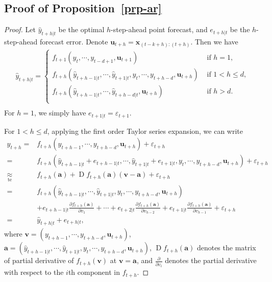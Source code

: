 \documentclass[
  11pt,
  a4paper,
]{article}
\theoremstyle{plain}
\theoremstyle{remark}
\begin{document}
\subsection{\texorpdfstring{Proof of
Proposition~\ref{prp-ar}}{Proof of Proposition~}}\label{sec-proof_ar}

\begin{proof}
Let \(\hat{y}_{t+h|t}\) be the optimal \(h\)-step-ahead point forecast,
and \(e_{t+h|t}\) be the \(h\)-step-ahead forecast error. Denote
\(\bm{u}_{t+h}=\bm{x}_{(t-k+h):(t+h)}\). Then we have \[
\begin{aligned}
\hat{y}_{t+h|t}=\begin{cases}
      f_{t+1}(y_t,\cdots,y_{t-d+1},\bm{u}_{t+1}) & \text{ if } h=1, \\
      f_{t+h}(\hat{y}_{t+h-1|t},\cdots,\hat{y}_{t+1|t},y_t,\cdots,y_{t+h-d},\bm{u}_{t+h}) &  \text{ if } 1 < h \leq d, \\
      f_{t+h}(\hat{y}_{t+h-1|t},\cdots,\hat{y}_{t+h-d|t},\bm{u}_{t+h}) & \text{ if } h > d.\\
    \end{cases}\\
\end{aligned}
\] For \(h=1\), we simply have \(e_{t+1|t} = \varepsilon_{t+1}\).

For \(1<h\leq d\), applying the first order Taylor series expansion, we
can write \[
\begin{aligned}
y_{t+h}
=&f_{t+h}(y_{t+h-1},\cdots,y_{t+h-d},\bm{u}_{t+h})+\varepsilon_{t+h} \\
=&f_{t+h}(\hat{y}_{t+h-1|t}+e_{t+h-1|t},\cdots,\hat{y}_{t+1|t}+e_{t+1|t},y_{t},\cdots,y_{t+h-d},\bm{u}_{t+h})+\varepsilon_{t+h} \\
\underset{\text{te}}{\approx}&f_{t+h}(\bm{a})+\operatorname{D}f_{t+h}(\bm{a})(\bm{v}-\bm{a})+
\varepsilon_{t+h} \\
=&f_{t+h}(\hat{y}_{t+h-1|t},\cdots,\hat{y}_{t+1|t},y_{t},\cdots,y_{t+h-d},\bm{u}_{t+h}) \\
&+e_{t+h-1|t}\frac{\partial f_{t+h}(\bm{a})}{\partial v_1}+\cdots+e_{t+2|t}\frac{\partial f_{t+h}(\bm{a})}{\partial v_{h-2}}+e_{t+1|t}\frac{\partial f_{t+h}(\bm{a})}{\partial v_{h-1}}+\varepsilon_{t+h} \\
=&\hat{y}_{t+h|t}+e_{t+h|t},
\end{aligned}
\] where \(\bm{v}=(y_{t+h-1},\cdots,y_{t+h-d},\bm{u}_{t+h})\),
\(\bm{a} =(\hat{y}_{t+h-1|t},\cdots,\hat{y}_{t+1|t},y_{t},\cdots,y_{t+h-d},\bm{u}_{t+h})\),
\(\operatorname{D}f_{t+h}(\bm{a})\) denotes the matrix of partial
derivative of \(f_{t+h}(\bm{v})\) at \(\bm{v}=\bm{a}\), and
\(\frac{\partial}{\partial v_i}\) denotes the partial derivative with
respect to the \(i\)th component in \(f_{t+h}\).


\end{proof}
\end{document}
